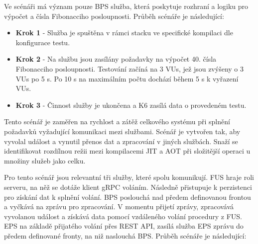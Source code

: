 
Ve scénáři má význam pouze BPS služba, která poskytuje rozhraní a logiku pro výpočet a čísla Fibonacciho posloupnosti. Průběh scénáře je následující:

\begin{itemize}
    \item \textbf{Krok 1} - Služba je spuštěna v rámci stacku ve specifické kompilaci dle konfigurace testu.
    \item \textbf{Krok 2} - Na službu jsou zasílány požadavky na výpočet 40. čísla Fibonacciho posloupnosti. Testování začíná na 3 VUs, jež jsou zvýšeny o 3 VUs po 5 s. Po 10 s na maximálním počtu dochází během 5 s k vyřazení VUs.
    \item \textbf{Krok 3} - Činnost služby je ukončena a K6 zasílá data o provedeném testu.
\end{itemize}


Tento scénář je zaměřen na rychlost a zátěž celkového systému při splnění požadavků vyžadující komunikaci mezi službami. Scénář je vytvořen tak, aby vyvolal událost a vynutil přenos dat a zpracování v jiných službách. Snaží se identifikovat rozdílnou režii mezi kompilacemi JIT a AOT při složitější operaci u množiny služeb jako celku.


Pro tento scénář jsou relevantní tři služby, které spolu komunikují. FUS hraje roli serveru, na něž se dotáže klient gRPC voláním. Následně přistupuje k perzistenci pro získání dat k splnění volání. BPS poslouchá nad předem definovanou frontou a vyčkává na zprávu pro zpracování. V momentu přijetí zprávy, zpracovává vyvolanou událost a získává data pomocí vzdáleného volání procedury z FUS. EPS na základě přijatého volání přes REST API, zasílá služba EPS zprávu do předem definované fronty, na niž naslouchá BPS. Průběh scénáře je následující:


